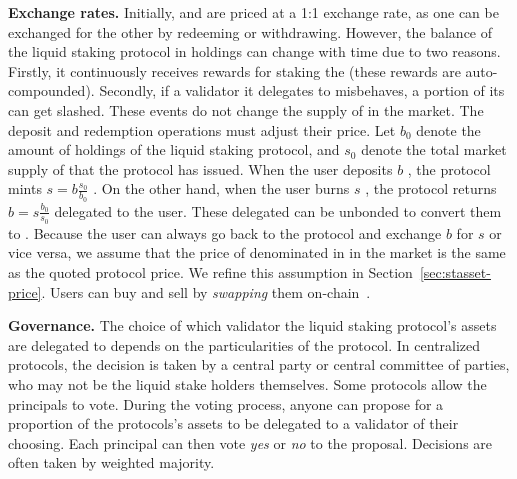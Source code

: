 \noindent
\textbf{Exchange rates.} Initially, \asset and \stasset are priced at a 1:1 exchange rate,
as one can be exchanged for the other by redeeming or withdrawing. However, the balance
of the liquid staking protocol in \asset holdings can change with time due to two reasons.
Firstly, it continuously receives rewards for staking the \asset (these rewards are
auto-compounded). Secondly, if a validator it delegates to misbehaves, a portion of its
\asset can get slashed. These events do not change the supply of \stasset in the market.
The deposit and redemption operations must adjust their price.
Let $b_0$ \asset denote the amount of \asset holdings of the liquid staking
protocol, and $s_0$ \stasset denote the total market supply of \stasset that the protocol
has issued. When the user deposits $b$ \asset, the protocol mints $s = b \frac{s_0}{b_0}$ \stasset.
On the other hand, when the user burns $s$ \asset, the protocol returns $b = s \frac{b_0}{s_0}$
delegated \asset to the user. These delegated \asset can be unbonded to convert them
to \asset. Because the user can always go back to the protocol and exchange $b$ for $s$ or
vice versa, we assume that the price of \stasset denominated in \asset in the
market is the same as the quoted protocol price. We refine this assumption in
Section~\ref{sec:stasset-price}.
Users can buy and sell \stassets by \emph{swapping} them on-chain~\cite{angeris2021analysis}.

\noindent
\textbf{Governance.}
The choice of which validator the liquid staking protocol's assets are delegated to
depends on the particularities of the protocol.
In centralized protocols, the decision is taken by a
central party or central committee of parties, who may not be the
liquid stake holders themselves.
Some protocols allow the principals to vote.
During the voting process, anyone can propose for a proportion of the protocols's assets
to be delegated to a validator of their choosing.
Each principal can then vote \emph{yes} or \emph{no}
to the proposal. Decisions are often taken by weighted majority.
